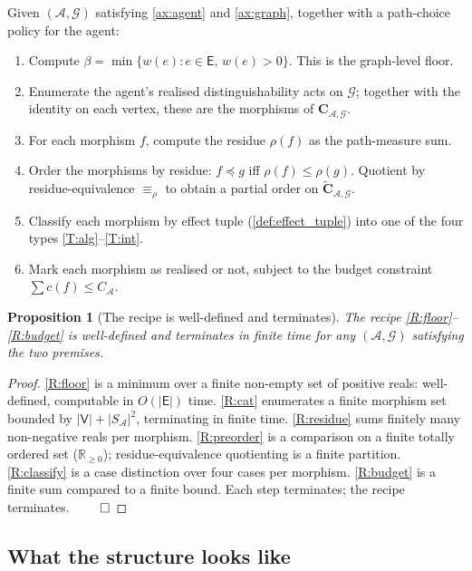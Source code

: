 \documentclass[11pt,a4paper]{article}
\theoremstyle{thmstyle}
\newtheorem{proposition}[theorem]{Proposition}
\theoremstyle{definition}
\theoremstyle{remark}
\newcommand{\R}{\mathbb{R}}
\newcommand{\Graph}{\mathcal{G}}
\newcommand{\Vrt}{\mathsf{V}}
\newcommand{\Edg}{\mathsf{E}}
\newcommand{\Agent}{\mathcal{A}}
\newcommand{\Res}{\rho}
\newcommand{\floor}{\beta}
\begin{document}
Given $(\Agent, \Graph)$ satisfying \cref{ax:agent} and
\cref{ax:graph}, together with a path-choice policy for the agent:
\begin{enumerate}[label=(R\arabic*),leftmargin=2.6em,nosep]
\item\label{R:floor} Compute $\floor = \min \{w(e) : e \in \Edg,\,
w(e) > 0\}$. This is the graph-level floor.
\item\label{R:cat} Enumerate the agent's realised
distinguishability acts on $\Graph$; together with the identity on
each vertex, these are the morphisms of
$\mathbf{C}_{\Agent,\Graph}$.
\item\label{R:residue} For each morphism $f$, compute the residue
$\Res(f)$ as the path-measure sum.
\item\label{R:preorder} Order the morphisms by residue:
$f \preceq g$ iff $\Res(f) \leq \Res(g)$. Quotient by
residue-equivalence $\equiv_\Res$ to obtain a partial order on
$\widetilde{\mathbf{C}}_{\Agent,\Graph}$.
\item\label{R:classify} Classify each morphism by effect tuple
(\cref{def:effect_tuple}) into one of the four types
\ref{T:alg}--\ref{T:int}.
\item\label{R:budget} Mark each morphism as realised or not,
subject to the budget constraint $\sum c(f) \leq C_\Agent$.
\end{enumerate}

\begin{proposition}[The recipe is well-defined and terminates]
\label{prop:recipe}
The recipe \ref{R:floor}--\ref{R:budget} is well-defined and
terminates in finite time for any $(\Agent, \Graph)$ satisfying
the two premises.
\end{proposition}

\begin{proof}
\ref{R:floor} is a minimum over a finite non-empty set of positive
reals: well-defined, computable in $O(|\Edg|)$ time.
\ref{R:cat} enumerates a finite morphism set bounded by
$|\Vrt| + |S_\Agent|^2$, terminating in finite time.
\ref{R:residue} sums finitely many non-negative reals per morphism.
\ref{R:preorder} is a comparison on a finite totally ordered set
($\R_{\geq 0}$); residue-equivalence quotienting is a finite
partition.
\ref{R:classify} is a case distinction over four cases per
morphism.
\ref{R:budget} is a finite sum compared to a finite bound.
Each step terminates; the recipe terminates. $\qed$
\end{proof}

\subsection{What the structure looks like}
\end{document}
